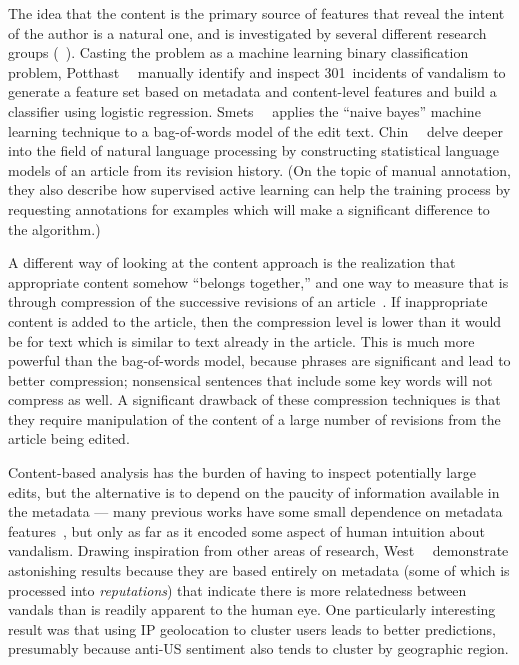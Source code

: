 The idea that the content is the primary source of features that
reveal the intent of the author is a natural one, and is investigated
by several different research groups
(\eg~\cite{Potthast2008,Smets2008,Druck2008,Itakura2009,Chin2010}).
Casting the problem as a machine learning binary classification
problem, Potthast~\etal~\cite{Potthast2008} manually identify and
inspect 301~incidents of vandalism to generate a feature set based on
metadata and content-level features and build a classifier using
logistic regression.
Smets~\etal~\cite{Smets2008} applies the ``naive bayes'' machine
learning technique to a bag-of-words model of the edit text.
Chin~\etal~\cite{Chin2010} delve deeper into the field of
natural language processing by constructing statistical language
models of an article from its revision history.
(On the topic of manual annotation, they also describe how supervised
active learning can help the training process by requesting
annotations for examples which will make a significant difference to
the algorithm.)

A different way of looking at the content approach is the
realization that appropriate content somehow ``belongs together,'' and
one way to measure that is through compression of the successive
revisions of an article~\cite{Smets2008,Itakura2009}.
If inappropriate content is added to the article, then the compression
level is lower than it would be for text which is similar to text
already in the article.
This is much more powerful than the bag-of-words model, because
phrases are significant and lead to better compression; nonsensical
sentences that include some key words will not compress as well.
A significant drawback of these compression techniques is that they
require manipulation of the content of a large number of revisions
from the article being edited.

Content-based analysis has the burden of having to
inspect potentially large edits, but the alternative is to depend
on the paucity of information available in the metadata ---
many previous works have some small dependence on metadata
features~\cite{Potthast2008,Druck2008,Belani2010}, but only
as far as it encoded some aspect of human intuition about vandalism.
Drawing inspiration from other areas of research,
West~\etal~\cite{West2010} demonstrate astonishing results because
they are based entirely on metadata (some of which is processed into
\textit{reputations}) that indicate there is more relatedness between
vandals than is readily apparent to the human eye.
One particularly interesting result was that using IP geolocation
to cluster users leads to better predictions, presumably because
anti-US sentiment also tends to cluster by geographic region.

